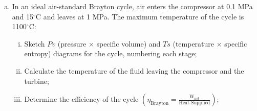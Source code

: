 \documentclass[calculator,steamtables,refrigeranttables,psychrometricchart,datasheet]{exam}
\newcommand{\frc}{\displaystyle\frac}
\begin{document}
\begin{question}
\begin{enumerate}[(a)]
\item In an ideal air-standard Brayton cycle, air enters the compressor at 0.1 MPa and 15$^{\circ}$C and leaves at 1 MPa. The maximum temperature of the cycle is 1100$^{\circ}$C:
\begin{enumerate}[(i)]
\item Sketch $Pv$ (pressure $\times$ specific volume) and $Ts$ (temperature $\times$ specific entropy) diagrams for the cycle, numbering each stage;~
%
\item Calculate the temperature of the fluid leaving the compressor and the turbine;~
%
\item Determine the efficiency of the cycle $\left(\eta_{\text{Brayton}}=\frc{\text{W}_{\text{net}}}{\text{Heat Supplied}}\right)$;~

\end{enumerate}
\end{enumerate}
\end{question}
\end{document}
